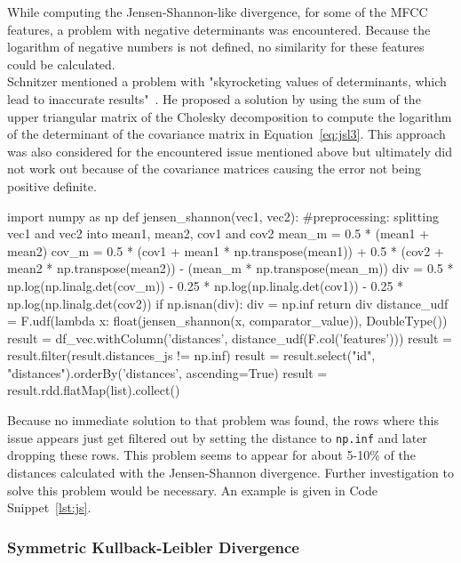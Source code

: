 While computing the Jensen-Shannon-like divergence, for some of the MFCC features, a problem with negative determinants was encountered. Because the logarithm of negative numbers is not defined, no similarity for these features could be calculated.\\ 
Schnitzer mentioned a problem with "skyrocketing values of determinants, which lead to inaccurate results"~\cite[p.45]{schnitzer1}. He proposed a solution by using the sum of the upper triangular matrix of the Cholesky decomposition to compute the logarithm of the determinant of the covariance matrix in Equation~\eqref{eq:jsl3}. 
This approach was also considered for the encountered issue mentioned above but ultimately did not work out because of the covariance matrices causing the error not being positive definite.\\

\begin{pythonCode}[frame=single,label={lst:js},caption={Jensen-Shannon-like divergence},captionpos=b]
import numpy as np
def jensen_shannon(vec1, vec2):
	#preprocessing: splitting vec1 and vec2 into mean1, mean2, cov1 and cov2
	mean_m = 0.5 * (mean1 + mean2)
	cov_m = 0.5 * (cov1 + mean1 * np.transpose(mean1)) + 0.5 * (cov2 + mean2 * np.transpose(mean2)) - (mean_m * np.transpose(mean_m))
	div = 0.5 * np.log(np.linalg.det(cov_m)) - 0.25 * np.log(np.linalg.det(cov1)) - 0.25 * np.log(np.linalg.det(cov2))  
	if np.isnan(div):
		div = np.inf
	return div
distance_udf = F.udf(lambda x: float(jensen_shannon(x, comparator_value)), DoubleType())
result = df_vec.withColumn('distances', distance_udf(F.col('features')))
result = result.filter(result.distances_js != np.inf)    
result = result.select("id", "distances").orderBy('distances', ascending=True)
result = result.rdd.flatMap(list).collect()
\end{pythonCode}

\noindent Because no immediate solution to that problem was found, the rows where this issue appears just get filtered out by setting the distance to \lstinline{np.inf} and later dropping these rows. This problem seems to appear for about 5-10\% of the distances calculated with the Jensen-Shannon divergence. Further investigation to solve this problem would be necessary. An example is given in Code Snippet~\ref{lst:js}.

\subsubsection{Symmetric Kullback-Leibler Divergence}\label{sparkskl}

